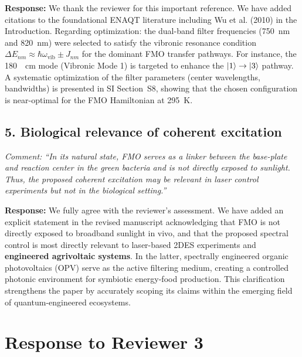 \documentclass[11pt]{article}
\begin{document}
\textbf{Response:} We thank the reviewer for this important reference. We have added citations to the foundational ENAQT literature including Wu et al. (2010) in the Introduction. Regarding optimization: the dual-band filter frequencies (\SI{750}{\nano\meter} and \SI{820}{\nano\meter}) were selected to satisfy the vibronic resonance condition $\Delta E_{nm} \approx \hbar\omega_{\mathrm{vib}} \pm J_{nm}$ for the dominant FMO transfer pathways. For instance, the \SI{180}{\per\centi\meter} mode (Vibronic Mode 1) is targeted to enhance the $\ket{1} \to \ket{3}$ pathway. A systematic optimization of the filter parameters (center wavelengths, bandwidths) is presented in SI Section~S8, showing that the chosen configuration is near-optimal for the FMO Hamiltonian at \SI{295}{\kelvin}.

\subsection*{5. Biological relevance of coherent excitation}
\textit{Comment: ``In its natural state, FMO serves as a linker between the base-plate and reaction center in the green bacteria and is not directly exposed to sunlight. Thus, the proposed coherent excitation may be relevant in laser control experiments but not in the biological setting.''}

\textbf{Response:} We fully agree with the reviewer's assessment. We have added an explicit statement in the revised manuscript acknowledging that FMO is not directly exposed to broadband sunlight in vivo, and that the proposed spectral control is most directly relevant to laser-based 2DES experiments and \textbf{engineered agrivoltaic systems}. In the latter, spectrally engineered organic photovoltaics (OPV) serve as the active filtering medium, creating a controlled photonic environment for symbiotic energy-food production. This clarification strengthens the paper by accurately scoping its claims within the emerging field of quantum-engineered ecosystems.

\vspace{2em}

\section*{Response to Reviewer 3}
\end{document}
